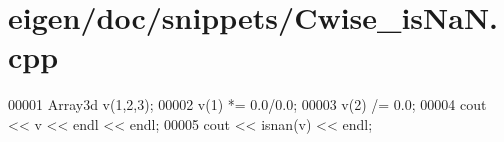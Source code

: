 \hypertarget{eigen_2doc_2snippets_2_cwise__is_na_n_8cpp_source}{}\section{eigen/doc/snippets/\+Cwise\+\_\+is\+NaN.cpp}
\label{eigen_2doc_2snippets_2_cwise__is_na_n_8cpp_source}

\begin{DoxyCode}
00001 Array3d v(1,2,3);
00002 v(1) *= 0.0/0.0;
00003 v(2) /= 0.0;
00004 cout << v << endl << endl;
00005 cout << isnan(v) << endl;
\end{DoxyCode}
